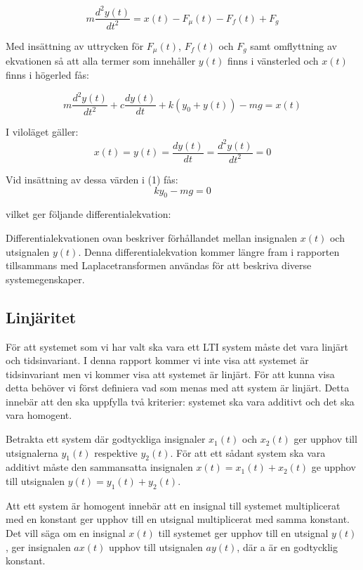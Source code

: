 $$m\frac{d^{2}y(t)}{dt^{2}} = x(t) - F_\mu(t) - F_f(t) + F_g$$

Med insättning av uttrycken för $F_\mu(t)$, $F_f(t)$ och $F_g$ samt omflyttning av ekvationen så att alla termer som innehåller $y(t)$ finns i vänsterled och $x(t)$ finns i högerled fås: 

\begin{equation}
m\frac{d^{2}y(t)}{dt^{2}} + c\frac{dy(t)}{dt} + k(y_{0}+y(t)) - mg=x(t)    
\end{equation}

I viloläget gäller: 
$$x(t) = y(t) = \frac{dy(t)}{dt} = \frac{d^{2}y(t)}{dt^{2}} = 0 $$

Vid insättning av dessa värden i (1) fås:
$$ky_{0} - mg = 0$$

vilket ger följande differentialekvation:

\begin{center}
    \par
\end{center}
Differentialekvationen ovan beskriver förhållandet mellan insignalen $x(t)$ och utsignalen $y(t)$. 
Denna differentialekvation kommer längre fram i rapporten tillsammans med Laplacetransformen användas för att beskriva diverse systemegenskaper. 

\subsection{Linjäritet}
För att systemet som vi har valt ska vara ett LTI system måste det vara linjärt och tidsinvariant. I denna rapport kommer vi inte visa att systemet är tidsinvariant men vi kommer visa att systemet är linjärt. För att kunna visa detta behöver vi först definiera vad som menas med att system är linjärt. Detta innebär att den ska uppfylla två kriterier: systemet ska vara additivt och det ska vara homogent.

Betrakta ett system där godtyckliga insignaler $x_1(t)$ och $x_2(t)$ ger upphov till utsignalerna $y_1(t)$ respektive $y_2(t)$. För att ett sådant system ska vara additivt måste den sammansatta insignalen $x(t)=x_1(t)+x_2(t)$ ge upphov till utsignalen $y(t)=y_1(t)+y_2(t)$.

Att ett system är homogent innebär att en insignal till systemet multiplicerat med en konstant ger upphov till en utsignal multiplicerat med samma konstant. Det vill säga om en insignal $x(t)$ till systemet ger upphov till en utsignal $y(t)$, ger insignalen $ax(t)$ upphov till utsignalen $ay(t)$, där a är en godtycklig konstant.

